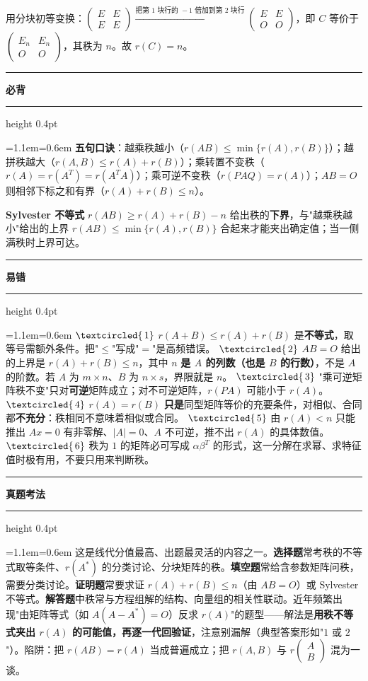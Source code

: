 \documentclass[11pt,openany,UTF8]{ctexbook}
\newcommand{\circled}[1]{\textcircled{\scriptsize\,#1}}
\newcommand{\callouthead}[2]{%
  \par\addvspace{7pt}\noindent
  {\color{#1}\rule[-0.15em]{3pt}{1.05em}}\hspace{0.5em}%
  {\bfseries\color{#1}#2}\par\nobreak\vspace{-0.35em}%
  {\color{rulesep}\hrule height 0.4pt}\nobreak\vspace{0.45em}%
  \begingroup\small\setlength{\parindent}{0pt}%
  \leftskip=1.1em\rightskip=0.6em\noindent\ignorespaces}
\newcommand{\calloutend}{\par\endgroup\addvspace{7pt}}
\newenvironment{callkey}[1]{\callouthead{keybar}{#1}}{\calloutend}
\newenvironment{callwarn}[1]{\callouthead{warnbar}{#1}}{\calloutend}
\newenvironment{callexam}[1]{\callouthead{exambar}{#1}}{\calloutend}
\begin{document}
用分块初等变换：$\begin{pmatrix}E&E\\E&E\end{pmatrix}\xrightarrow{\text{把第 1 块行的 }-1\text{ 倍加到第 2 块行}}\begin{pmatrix}E&E\\O&O\end{pmatrix}$，即 $C$ 等价于 $\begin{pmatrix}E_n&E_n\\O&O\end{pmatrix}$，其秩为 $n$。故 $r(C)=n$。

\begin{callkey}{必背}
\textbf{五句口诀}：越乘秩越小（$r(AB)\le\min\{r(A),r(B)\}$）；越拼秩越大（$r(A,B)\le r(A)+r(B)$）；乘转置不变秩（$r(A)=r(A^T)=r(A^TA)$）；乘可逆不变秩（$r(PAQ)=r(A)$）；$AB=O$ 则相邻下标之和有界（$r(A)+r(B)\le n$）。

\textbf{Sylvester 不等式} $r(AB)\ge r(A)+r(B)-n$ 给出秩的\textbf{下界}，与"越乘秩越小"给出的上界 $r(AB)\le\min\{r(A),r(B)\}$ 合起来才能夹出确定值；当一侧满秩时上界可达。

\end{callkey}

\begin{callwarn}{易错}
$\circled{1}$ $r(A+B)\le r(A)+r(B)$ 是\textbf{不等式}，取等号需额外条件。把"$\le$"写成"$=$"是高频错误。 $\circled{2}$ $AB=O$ 给出的上界是 $r(A)+r(B)\le n$，其中 $n$ \textbf{是 $A$ 的列数（也是 $B$ 的行数）}，不是 $A$ 的阶数。若 $A$ 为 $m\times n$、$B$ 为 $n\times s$，界限就是 $n$。 $\circled{3}$ "乘可逆矩阵秩不变"只对\textbf{可逆}矩阵成立；对不可逆矩阵，$r(PA)$ 可能小于 $r(A)$。 $\circled{4}$ $r(A)=r(B)$ \textbf{只是}同型矩阵等价的充要条件，对相似、合同都\textbf{不充分}：秩相同不意味着相似或合同。 $\circled{5}$ 由 $r(A)<n$ 只能推出 $Ax=0$ 有非零解、$\vert A\vert=0$、$A$ 不可逆，推不出 $r(A)$ 的具体数值。 $\circled{6}$ 秩为 $1$ 的矩阵必可写成 $\alpha\beta^T$ 的形式，这一分解在求幂、求特征值时极有用，不要只用来判断秩。

\end{callwarn}

\begin{callexam}{真题考法}
这是线代分值最高、出题最灵活的内容之一。\textbf{选择题}常考秩的不等式取等条件、$r(A^*)$ 的分类讨论、分块矩阵的秩。\textbf{填空题}常给含参数矩阵问秩，需要分类讨论。\textbf{证明题}常要求证 $r(A)+r(B)\le n$（由 $AB=O$）或 Sylvester 不等式。\textbf{解答题}中秩常与方程组解的结构、向量组的相关性联动。近年频繁出现"由矩阵等式（如 $A(A-A^*)=O$）反求 $r(A)$"的题型——解法是\textbf{用秩不等式夹出 $r(A)$ 的可能值，再逐一代回验证}，注意别漏解（典型答案形如"$1$ 或 $2$"）。陷阱：把 $r(AB)=r(A)$ 当成普遍成立；把 $r(A,B)$ 与 $r\begin{pmatrix}A\\B\end{pmatrix}$ 混为一谈。

\end{callexam}
\end{document}

